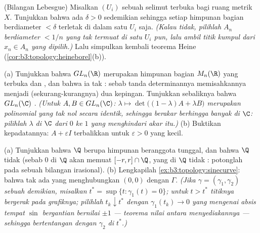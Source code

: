 \begin{exercise}[$\star\star$]\label{exo:b3:topology:7}
(Bilangan Lebesgue) Misalkan $(U_i)$ sebuah selimut terbuka bagi ruang
metrik  $X$. Tunjukkan bahwa ada $\delta > 0$ sedemikian sehingga setiap
himpunan bagian berdiameter $< \delta$ terletak di dalam satu $U_i$ saja.
\emph{(Kalau tidak, pilihlah $A_n$ berdiameter $< 1/n$ yang tak termuat di satu $U_i$ pun, lalu
ambil titik kumpul dari $x_n \in A_n$ yang dipilih.)} Lalu simpulkan kembali teorema
Heine (\cref{cor:b3:topology:heineborel}(b)).
\end{exercise}

\begin{exercise}[$\star\star$]\label{exo:b3:topology:8}
(a) Tunjukkan bahwa $GL_n(\R)$ merupakan himpunan bagian $M_n(\R)$ yang terbuka dan ,
dan bahwa ia tak : sebab tanda determinannya
memisahkannya menjadi (sekurang-kurangnya) dua kepingan. Tunjukkan sebaliknya
bahwa $GL_n(\C)$ .
\emph{(Untuk $A, B \in GL_n(\C)$: $\lambda \mapsto \det\bigl((1 -
\lambda)A + \lambda B\bigr)$ merupakan polinomial yang tak nol secara
identik, sehingga berakar berhingga banyak di $\C$: pilihlah 
$\lambda$ di $\C$ dari $0$ ke $1$ yang menghindari akar itu.)}
(b) Buktikan kepadatannya: $A + \varepsilon I$ terbalikkan untuk $\varepsilon > 0$
yang kecil.
\end{exercise}

\begin{exercise}[$\star\star$]\label{exo:b3:topology:9}
(a) Tunjukkan bahwa  $\Q$ berupa himpunan
beranggota tunggal, dan bahwa $\Q$ tidak  (sebab  
$0$ di $\Q$ akan memuat $[-r, r]\cap\Q$,
yang  di $\Q$ tidak : potonglah pada sebuah bilangan irasional).
(b) Lengkapilah \cref{ex:b3:topology:sinecurve}: bahwa tak ada  yang menghubungkan
$(0,0)$ dengan $\Gamma$. \emph{(Jika $\gamma = (\gamma_1, \gamma_2)$
sebuah  demikian, misalkan $t^* = \sup\{t : \gamma_1(t) = 0\}$; untuk $t
> t^*$ titiknya bergerak pada grafiknya; pilihlah $t_k \downarrow
t^*$ dengan $\gamma_1(t_k) \to 0$ yang mengenai absis tempat $\sin$
bergantian bernilai $\pm1$ --- teorema nilai antara
menyediakannya --- sehingga bertentangan dengan  $\gamma_2$ di
$t^*$.)}
\end{exercise}

